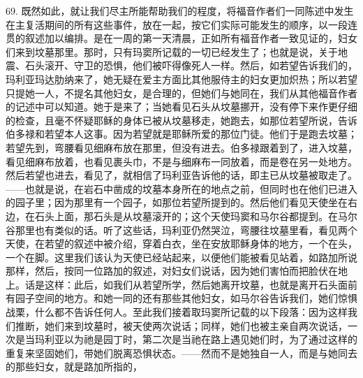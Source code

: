 69. 既然如此，就让我们尽主所能帮助我们的程度，将福音作者们一同陈述中发生在主复活期间的所有这些事件，放在一起，按它们实际可能发生的顺序，以一段连贯的叙述加以编排。是在一周的第一天清晨，正如所有福音作者一致见证的，妇女们来到坟墓那里。那时，只有玛窦所记载的一切已经发生了；也就是说，关于地震、石头滚开、守卫的恐惧，他们被吓得像死人一样。然后，如若望告诉我们的，玛利亚玛达肋纳来了，她无疑在爱主方面比其他服侍主的妇女更加炽热；所以若望只提她一人，不提名其他妇女，是合理的，但她们与她同在，我们从其他福音作者的记述中可以知道。她于是来了；当她看见石头从坟墓挪开，没有停下来作更仔细的检查，且毫不怀疑耶稣的身体已被从坟墓移走，她跑去，如那位若望所说，告诉伯多禄和若望本人这事。因为若望就是耶稣所爱的那位门徒。他们于是跑去坟墓；若望先到，弯腰看见细麻布放在那里，但没有进去。伯多禄跟着到了，进入坟墓，看见细麻布放着，也看见裹头巾，不是与细麻布一同放着，而是卷在另一处地方。然后若望也进去，看见了，就相信了玛利亚告诉他的话，即主已从坟墓被取走了。——也就是说，在岩石中凿成的坟墓本身所在的地点之前，但同时也在他们已进入的园子里；因为那里有一个园子，如那位若望所提到的。然后他们看见天使坐在右边，在石头上面，那石头是从坟墓滚开的；这个天使玛窦和马尔谷都提到。在马尔谷那里也有类似的话。听了这些话，玛利亚仍然哭泣，弯腰往坟墓里看，看见两个天使，在若望的叙述中被介绍，穿着白衣，坐在安放耶稣身体的地方，一个在头，一个在脚。这里我们该认为天使已经站起来，以便他们能被看见站着，如路加所说那样，然后，按同一位路加的叙述，对妇女们说话，因为她们害怕而把脸伏在地上。话是这样：此后，如我们从若望所学，然后她离开坟墓，也就是离开石头面前有园子空间的地方。和她一同的还有那些其他妇女，如马尔谷告诉我们，她们惊惧战栗，什么都不告诉任何人。至此我们接着取玛窦所记载的以下段落：因为这样我们推断，她们来到坟墓时，被天使两次说话；同样，她们也被主亲自两次说话，一次是当玛利亚以为祂是园丁时，第二次是当祂在路上遇见她们时，为了通过这样的重复来坚固她们，带她们脱离恐惧状态。——然而不是她独自一人，而是与她同去的那些妇女，就是路加所指的，\Bib
